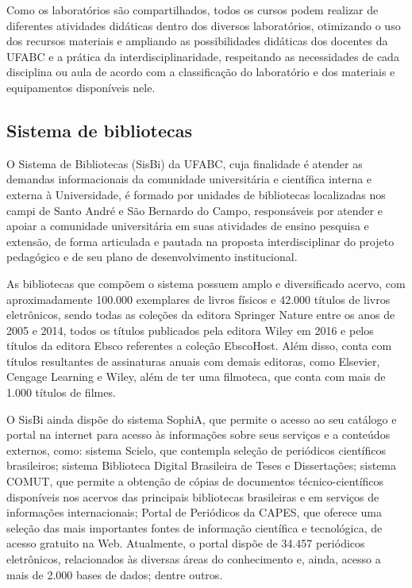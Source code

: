 Como os laboratórios são compartilhados, todos os cursos podem realizar de
diferentes atividades didáticas dentro dos diversos laboratórios, otimizando o
uso dos recursos materiais e ampliando as possibilidades didáticas dos docentes
da UFABC e a prática da interdisciplinaridade, respeitando as necessidades de
cada disciplina ou aula de acordo com a classificação do laboratório e dos
materiais e equipamentos disponíveis nele.

\subsection{Sistema de bibliotecas}

O Sistema de Bibliotecas (SisBi) da UFABC, cuja finalidade é atender as demandas
informacionais da comunidade universitária e científica interna e externa à
Universidade, é formado por unidades de bibliotecas localizadas nos campi de
Santo André e São Bernardo do Campo, responsáveis por atender e apoiar a
comunidade universitária em suas atividades de ensino pesquisa e extensão, de
forma articulada e pautada na proposta interdisciplinar do projeto pedagógico e
de seu plano de desenvolvimento institucional.

As bibliotecas que compõem o sistema possuem amplo e diversificado acervo, com
aproximadamente 100.000 exemplares de livros físicos e 42.000 títulos de livros
eletrônicos, sendo todas as coleções da editora Springer Nature entre os anos
de 2005 e 2014, todos os títulos publicados pela editora Wiley em 2016 e
pelos títulos da editora Ebsco referentes a coleção EbscoHost. 
Além disso, conta com títulos resultantes de assinaturas anuais com demais
editoras, como Elsevier, Cengage Learning e Wiley, além de ter uma filmoteca,
que conta com mais de 1.000 títulos de filmes.

O SisBi ainda dispõe do sistema SophiA, que permite o acesso ao seu catálogo e
portal na internet para acesso às informações sobre seus serviços e a conteúdos
externos, como: sistema Scielo, que contempla seleção de periódicos científicos
brasileiros; sistema Biblioteca Digital Brasileira de Teses e Dissertações;
sistema COMUT, que permite a obtenção de cópias de documentos
técnico-científicos disponíveis nos acervos das principais bibliotecas
brasileiras e em serviços de informações internacionais; Portal de Periódicos
da CAPES, que oferece uma seleção das mais importantes fontes de informação
científica e tecnológica, de acesso gratuito na Web.
Atualmente, o portal dispõe de 34.457 periódicos eletrônicos, relacionados às
diversas áreas do conhecimento e, ainda, acesso a mais de 2.000 bases de dados;
dentre outros.

